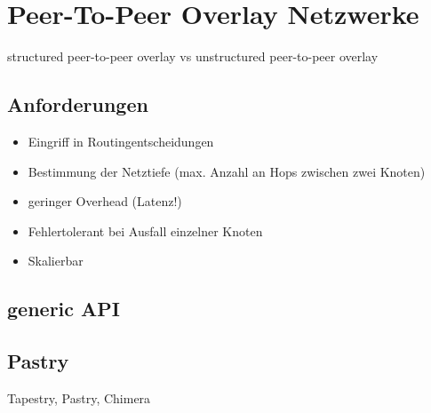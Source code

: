 \section{Peer-To-Peer Overlay Netzwerke}
\label{chap:grundlagen:overlay}
structured peer-to-peer overlay vs unstructured peer-to-peer overlay

\subsection{Anforderungen}
\begin{itemize}
\item Eingriff in Routingentscheidungen
\item Bestimmung der Netztiefe (max. Anzahl an Hops zwischen zwei Knoten)
\item geringer Overhead (Latenz!)
\item Fehlertolerant bei Ausfall einzelner Knoten
\item Skalierbar
\end{itemize}

\subsection{generic API}
\cite{citeulike:6643572} %

\subsection{Pastry}
\cite{citeulike:780210} %
Tapestry, Pastry, Chimera
